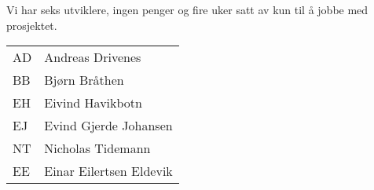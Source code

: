 
Vi har seks utviklere, ingen penger og fire uker satt av kun til å jobbe med prosjektet.



\begin{table}
 \centering
	\begin{tabular}{l l}
	AD & Andreas Drivenes\\
	BB & Bjørn Bråthen\\
	EH & Eivind Havikbotn\\
	EJ & Evind Gjerde Johansen\\
	NT & Nicholas Tidemann\\
	EE & Einar Eilertsen Eldevik\\
	\end{tabular}

\end{table}